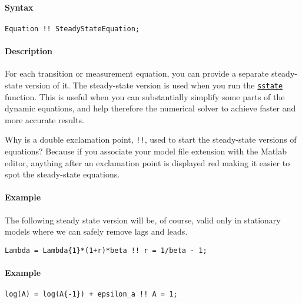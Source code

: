 


	\paragraph{Syntax}\label{syntax}

\begin{verbatim}
Equation !! SteadyStateEquation;
\end{verbatim}

\paragraph{Description}\label{description}

For each transition or measurement equation, you can provide a separate
steady-state version of it. The steady-state version is used when you
run the \href{model/sstate}{\texttt{sstate}} function. This is useful
when you can substantially simplify some parts of the dynamic equations,
and help therefore the numerical solver to achieve faster and more
accurate results.

Why is a double exclamation point, \texttt{!!}, used to start the
steady-state versions of equations? Because if you associate your model
file extension with the Matlab editor, anything after an exclamation
point is displayed red making it easier to spot the steady-state
equations.

\paragraph{Example}\label{example}

The following steady state version will be, of course, valid only in
stationary models where we can safely remove lags and leads.

\begin{verbatim}
Lambda = Lambda{1}*(1+r)*beta !! r = 1/beta - 1;
\end{verbatim}

\paragraph{Example}\label{example-1}

\begin{verbatim}
log(A) = log(A{-1}) + epsilon_a !! A = 1;
\end{verbatim}


